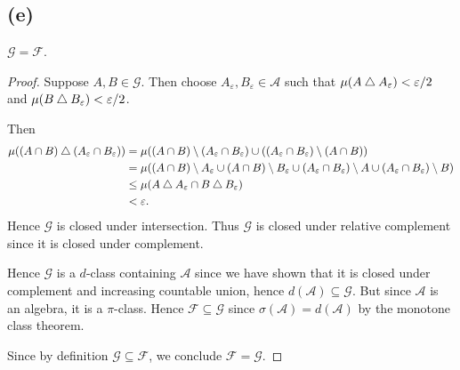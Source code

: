 \documentclass{unswmaths}
\begin{document}
\subsection*{(e)}
\begin{theorem}
    $\mathcal{G} = \mathcal{F}$.
\end{theorem}
\begin{proof}
    Suppose $A,B \in \mathcal{G}$. Then 
    choose $A_\varepsilon,B_\varepsilon \in \mathcal{A}$ such that
    $\mu(A\bigtriangleup A_\varepsilon) < \varepsilon/2$ and $\mu(B\bigtriangleup B_\varepsilon) < \varepsilon/2$.
    
    Then 
    \begin{align*}
        \mu((A\cap B)\bigtriangleup (A_\varepsilon\cap B_\varepsilon)) &= \mu((A\cap B)\setminus(A_\varepsilon \cap B_\varepsilon)\cup((A_\varepsilon\cap B_\varepsilon)\setminus (A\cap B))\\
        &= \mu((A\cap B)\setminus A_\varepsilon \cup (A\cap B)\setminus B_\varepsilon \cup (A_\varepsilon \cap B_\varepsilon)\setminus A \cup (A_\varepsilon \cap B_\varepsilon)\setminus B)\\
        &\leq \mu(A\bigtriangleup A_\varepsilon \cap B\bigtriangleup B_\varepsilon)\\
        &< \varepsilon.        
    \end{align*}
    Hence $\mathcal{G}$ is closed under intersection. Thus $\mathcal{G}$
    is closed under relative complement since it is closed
    under complement.

    Hence $\mathcal{G}$ is a $d$-class containing $\mathcal{A}$ since we have
    shown that it is closed under complement and increasing countable union, hence $d(\mathcal{A}) \subseteq \mathcal{G}$.
    But since $\mathcal{A}$ is an algebra, it is a $\pi$-class. Hence $\mathcal{F} \subseteq \mathcal{G}$
    since $\sigma(\mathcal{A}) = d(\mathcal{A})$ by the monotone class theorem.  
    
    Since by definition $\mathcal{G} \subseteq \mathcal{F}$,
    we conclude $\mathcal{F} = \mathcal{G}$.  
\end{proof}
\end{document}
